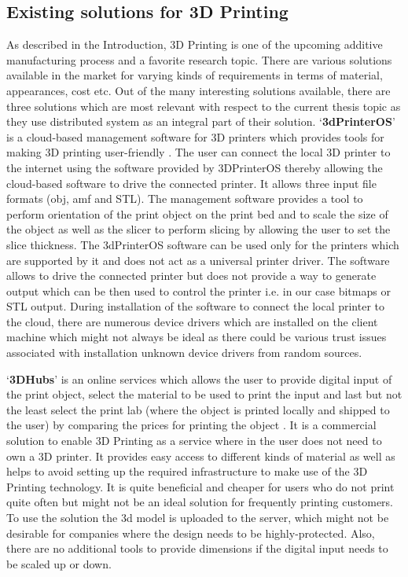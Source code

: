 \begin{itemize}
  


\section{Existing solutions for 3D Printing}

As described in the Introduction, 3D Printing is one of the upcoming additive manufacturing process and a favorite research topic. There are various solutions available in the market for varying kinds of requirements in terms of material, appearances, cost etc. Out of the many interesting solutions available, there are three solutions which are most relevant with respect to the current thesis topic as they use distributed system as an integral part of their solution. {\lq}\textbf{3dPrinterOS}{\rq} is a cloud-based management software for 3D printers which provides tools for making 3D printing user-friendly \cite{3dprinteros}. The user can connect the local 3D printer to the internet using the software provided by 3DPrinterOS thereby allowing the cloud-based software to drive the connected printer. It allows three input file formats (obj, amf and STL). The management software provides a tool to perform orientation of the print object on the print bed and to scale the size of the object as well as the slicer to perform slicing by allowing the user to set the slice thickness. The 3dPrinterOS software can be used only for the printers which are supported by it and does not act as a universal printer driver. The software allows to drive the connected printer but does not provide a way to generate output which can be then used to control the printer i.e. in our case bitmaps or STL output. During installation of the software to connect the local printer to the cloud, there are numerous device drivers which are installed on the client machine which might not always be ideal as there could be various trust issues associated with installation unknown device drivers from random sources. \newline

{\lq}\textbf{3DHubs}{\rq} is an online services which allows the user to provide digital input of the print object, select the material to be used to print the input and last but not the least select the print lab (where the object is printed locally and shipped to the user) by comparing the prices for printing the object \cite{3dhub}. It is a commercial solution to enable 3D Printing as a service where in the user does not need to own a 3D printer. It provides easy access to different kinds of material as well as helps to avoid setting up the required infrastructure to make use of the 3D Printing technology. It is quite beneficial and cheaper for users who do not print quite often but might not be an ideal solution for frequently printing customers. To use the solution the 3d model is uploaded to the server, which might not be desirable for companies where the design needs to be highly-protected. Also, there are no additional tools to provide dimensions if the digital input needs to be scaled up or down. \newline     


\end{itemize}
